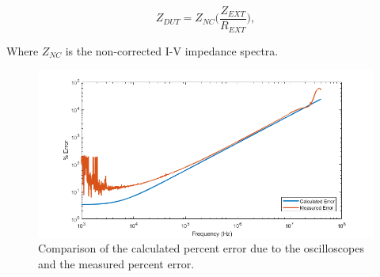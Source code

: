 \begin{equation}
    Z_{DUT} = Z_{NC}\bigg(\frac{Z_{EXT}}{R_{EXT}}\bigg),
\end{equation}

\noindent Where $Z_{NC}$ is the non-corrected I-V impedance spectra.


\begin{figure}[h]
    \centering
    \includegraphics[width=\textwidth]{images/percentError.png}
    \caption{Comparison of the calculated percent error due to the oscilloscopes and the measured percent error.}
    \label{fig:test_circ_measurement_error}
\end{figure}

